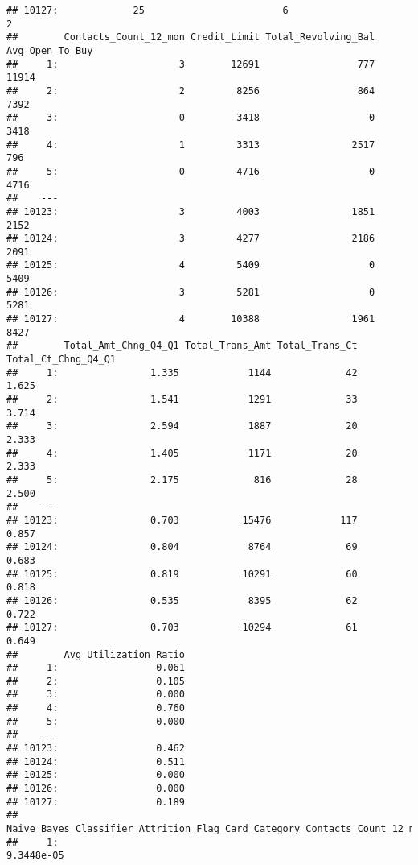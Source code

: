 \documentclass[]{article}
\begin{document}
\begin{verbatim}
## 10127:             25                        6                      2
##        Contacts_Count_12_mon Credit_Limit Total_Revolving_Bal Avg_Open_To_Buy
##     1:                     3        12691                 777           11914
##     2:                     2         8256                 864            7392
##     3:                     0         3418                   0            3418
##     4:                     1         3313                2517             796
##     5:                     0         4716                   0            4716
##    ---                                                                       
## 10123:                     3         4003                1851            2152
## 10124:                     3         4277                2186            2091
## 10125:                     4         5409                   0            5409
## 10126:                     3         5281                   0            5281
## 10127:                     4        10388                1961            8427
##        Total_Amt_Chng_Q4_Q1 Total_Trans_Amt Total_Trans_Ct Total_Ct_Chng_Q4_Q1
##     1:                1.335            1144             42               1.625
##     2:                1.541            1291             33               3.714
##     3:                2.594            1887             20               2.333
##     4:                1.405            1171             20               2.333
##     5:                2.175             816             28               2.500
##    ---                                                                        
## 10123:                0.703           15476            117               0.857
## 10124:                0.804            8764             69               0.683
## 10125:                0.819           10291             60               0.818
## 10126:                0.535            8395             62               0.722
## 10127:                0.703           10294             61               0.649
##        Avg_Utilization_Ratio
##     1:                 0.061
##     2:                 0.105
##     3:                 0.000
##     4:                 0.760
##     5:                 0.000
##    ---                      
## 10123:                 0.462
## 10124:                 0.511
## 10125:                 0.000
## 10126:                 0.000
## 10127:                 0.189
##        Naive_Bayes_Classifier_Attrition_Flag_Card_Category_Contacts_Count_12_mon_Dependent_count_Education_Level_Months_Inactive_12_mon_1
##     1:                                                                                                                         9.3448e-05

\end{verbatim}
\end{document}
